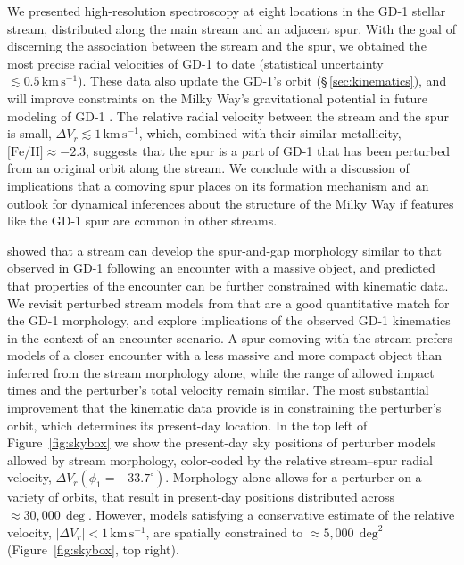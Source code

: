 \documentclass[twocolumn]{aastex63}
\newcommand{\kms}{\ensuremath{\textrm{km}\,\textrm{s}^{-1}}}
\newcommand{\feh}{\ensuremath{\textrm{[Fe/H]}}}
\begin{document}
We presented high-resolution spectroscopy at eight locations in the GD-1 stellar stream, distributed along the main stream and an adjacent spur.
With the goal of discerning the association between the stream and the spur, we obtained the most precise radial velocities of GD-1 to date (statistical uncertainty $\lesssim0.5\,\kms$).
These data also update the GD-1's orbit (\S\,\ref{sec:kinematics}), and will improve constraints on the Milky Way's gravitational potential in future modeling of GD-1 \citep[e.g.,][]{koposov2010, bowden2015}.
The relative radial velocity between the stream and the spur is small, $\Delta V_r\lesssim1\,\kms$, which, combined with their similar metallicity, $\feh\approx-2.3$, suggests that the spur is a part of GD-1 that has been perturbed from an original orbit along the stream.
We conclude with a discussion of implications that a comoving spur places on its formation mechanism and an outlook for dynamical inferences about the structure of the Milky Way if features like the GD-1 spur are common in other streams.

\citet{bonaca2019a} showed that a stream can develop the spur-and-gap morphology similar to that observed in GD-1 following an encounter with a massive object, and predicted that properties of the encounter can be further constrained with kinematic data.
We revisit perturbed stream models from \citet{bonaca2019a} that are a good quantitative match for the GD-1 morphology, and explore implications of the observed GD-1 kinematics in the context of an encounter scenario.
A spur comoving with the stream prefers models of a closer encounter with a less massive and more compact object than inferred from the stream morphology alone, while the range of allowed impact times and the perturber's total velocity remain similar.
The most substantial improvement that the kinematic data provide is in constraining the perturber's orbit, which determines its present-day location.
In the top left of Figure~\ref{fig:skybox} we show the present-day sky positions of perturber models allowed by stream morphology, color-coded by the relative stream--spur radial velocity, $\Delta V_r(\phi_1=-33.7^\circ)$.
Morphology alone allows for a perturber on a variety of orbits, that result in present-day positions distributed across $\approx30,000\,\deg$.
However, models satisfying a conservative estimate of the relative velocity, $|\Delta V_r|<1\,\kms$, are spatially constrained to $\approx5,000\,\deg^2$ (Figure~\ref{fig:skybox}, top right).
\end{document}
